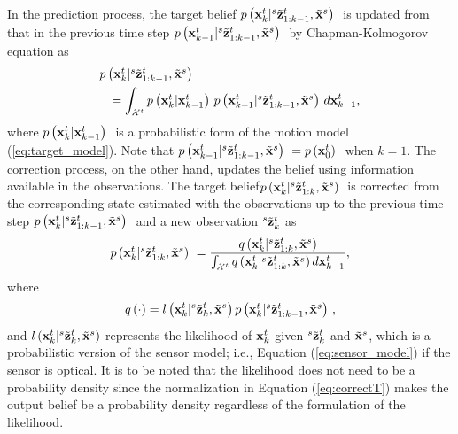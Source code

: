 In the prediction process, the target belief $\mbox{$ {p} \left ( \mathbf{x}_{k}^{t}|{}^{s}\tilde {\mathbf{z}}_{1:k-1}^{t},\tilde {\mathbf{x}}^{s} \right )$ }$ is updated from that in the previous time step \linebreak[4]$\mbox{$ {p} \left ( \mathbf{x}_{k-1}^{t}|{}^{s}\tilde {\mathbf{z}}_{1:k-1}^{t},\tilde {\mathbf{x}}^{s} \right )$ }$ by Chapman-Kolmogorov equation as
\begin{eqnarray}\label{eq:predictT}
\lefteqn{\p{\Vxbp{k}{t}|\ptVzbp{s}{1:k-1}{t},\tVxp{s}}} \nonumber\\
&&= \int_{\Cal{X}^t} \p{\Vxbp{k}{t}|\Vxbp{k-1}{t}} \p{\Vxbp{k-1}{t}|\ptVzbp{s}{1:k-1}{t},\tVxp{s}} d\Vxbp{k-1}{t},\nonumber\\
\end{eqnarray}
where $\mbox{$ {p} \left ( \mathbf{x}_{k}^{t}|\mathbf{x}_{k-1}^{t} \right )$ }$ is a probabilistic form of the motion model (\ref{eq:target_model}).  Note that $\mbox{$ {p} \left ( \mathbf{x}_{k-1}^{t}|{}^{s}\tilde {\mathbf{z}}_{1:k-1}^{t},\tilde {\mathbf{x}}^{s} \right )$ } = \mbox{$ {p} \left ( \mathbf{x}_{0}^{t} \right )$ }$ when $k=1$.
The correction process, on the other hand, updates the belief using information available in the observations.  The target belief\linebreak[4] $\mbox{$ {p} \left ( \mathbf{x}_{k}^{t}|{}^{s}\tilde {\mathbf{z}}_{1:k}^{t},\tilde {\mathbf{x}}^{s} \right )$ }$ is corrected from the corresponding state estimated with the observations up to the previous time step $\mbox{$ {p} \left ( \mathbf{x}_{k}^{t}|{}^{s}\tilde {\mathbf{z}}_{1:k-1}^{t},\tilde {\mathbf{x}}^{s} \right )$ }$ and a new observation ${}^{s}\tilde {\mathbf{z}}_{k}^{t}$ as
\begin{eqnarray}\label{eq:correctT}
\mbox{$ {p} \left ( \mathbf{x}_{k}^{t}|{}^{s}\tilde {\mathbf{z}}_{1:k}^{t},\tilde {\mathbf{x}}^{s} \right )$ } = \frac{q \left ( \mathbf{x}_{k}^{t}|{}^{s}\tilde {\mathbf{z}}_{1:k}^{t},\tilde {\mathbf{x}}^{s} \right )} {\int_{\mathcal{X}^t}
q \left ( \mathbf{x}_{k}^{t}|{}^{s}\tilde {\mathbf{z}}_{1:k}^{t},\tilde {\mathbf{x}}^{s} \right ) d\mathbf{x}_{k-1}^{t}},
\end{eqnarray}
where 
\begin{eqnarray}\label{eq:qT}
q \left ( \cdot \right ) = {l \left ( \mathbf{x}_{k}^{t}|{}^{s}\tilde {\mathbf{z}}_{k}^{t},\tilde {\mathbf{x}}^{s} \right ) \mbox{$ {p} \left ( \mathbf{x}_{k}^{t}|{}^{s}\tilde {\mathbf{z}}_{1:k-1}^{t},\tilde {\mathbf{x}}^{s} \right )$ }}, 
\end{eqnarray}
and $l \left ( \mathbf{x}_{k}^{t}|{}^{s}\tilde {\mathbf{z}}_{k}^{t},\tilde {\mathbf{x}}^{s} \right )$ represents the likelihood of $\mathbf{x}_{k}^{t}$ given ${}^{s}\tilde {\mathbf{z}}_{k}^{t}$ and $\tilde {\mathbf{x}}^{s}$, which is a probabilistic version of the sensor model; i.e., Equation (\ref{eq:sensor_model}) if the sensor is optical.  It is to be noted that the likelihood does not need to be a probability density since the normalization in Equation (\ref{eq:correctT}) makes the output belief be a probability density regardless of the formulation of the likelihood.  


